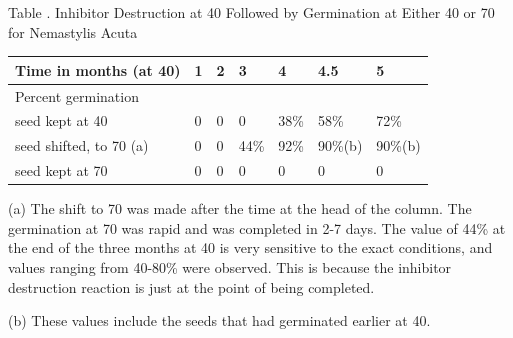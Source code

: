 \begin{table}[h]
\begin{center}
Table \thetable. Inhibitor Destruction at 40 Followed by Germination at Either 40 or 70 for
Nemastylis Acuta
\end{center}
\par
\begin{tabular}{|l l|l|l|l|l|l|}
\hline
Time in months (at 40)        & 1 & 2 & 3    & 4    & 4.5     & 5 \\
\hline
Percent germination           & & & & & & \\
\quad seed kept at 40         & 0 & 0 & 0    & 38\% & 58\%    & 72\% \\
\quad seed shifted, to 70 (a) & 0 & 0 & 44\% & 92\% & 90\%(b) & 90\%(b) \\
\quad seed kept at 70         & 0 & 0 & 0    & 0    & 0       &  0 \\
\hline
\end{tabular}

\hfil

(a) The shift to 70 was made after the time at the head of the column. The
germination at 70 was rapid and was completed in 2-7 days. The value of 44\% at the
end of the three months at 40 is very sensitive to the exact conditions, and values
ranging from 40-80\% were observed. This is because the inhibitor destruction
reaction is just at the point of being completed.

(b) These values include the seeds that had germinated earlier at 40.

\label{table:acuta}
\end{table}

